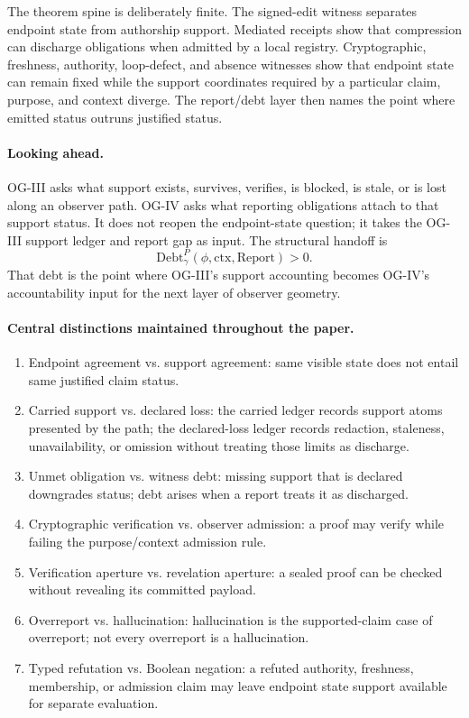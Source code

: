 \documentclass[11pt,twoside]{article}
\theoremstyle{definition}
\newcommand{\Debt}{\mathrm{Debt}}
\newcommand{\Report}{\mathrm{Report}}
\newcommand{\ctx}{\mathrm{ctx}}
\begin{document}
The theorem spine is deliberately finite. The signed-edit witness separates
endpoint state from authorship support. Mediated receipts show that compression
can discharge obligations when admitted by a local registry. Cryptographic,
freshness, authority, loop-defect, and absence witnesses show that endpoint
state can remain fixed while the support coordinates required by a particular
claim, purpose, and context diverge. The report/debt layer then names the point
where emitted status outruns justified status.

\paragraph{Looking ahead.}
OG-III asks what support exists, survives, verifies, is blocked, is stale, or
is lost along an observer path. OG-IV asks what reporting obligations attach to
that support status. It does not reopen the endpoint-state question; it takes
the OG-III support ledger and report gap as input. The structural handoff is
\[
  \Debt_\gamma^P(\phi,\ctx,\Report)>0.
\]
That debt is the point where OG-III's support accounting becomes OG-IV's
accountability input for the next layer of observer geometry.

\paragraph{Central distinctions maintained throughout the paper.}
\begin{enumerate}[leftmargin=*,label=\arabic*.]
  \item Endpoint agreement vs. support agreement: same visible state does not
        entail same justified claim status.
  \item Carried support vs. declared loss: the carried ledger records support
        atoms presented by the path; the declared-loss ledger records redaction,
        staleness, unavailability, or omission without treating those limits as
        discharge.
  \item Unmet obligation vs. witness debt: missing support that is declared
        downgrades status; debt arises when a report treats it as discharged.
  \item Cryptographic verification vs. observer admission: a proof may verify
        while failing the purpose/context admission rule.
  \item Verification aperture vs. revelation aperture: a sealed proof can be
        checked without revealing its committed payload.
  \item Overreport vs. hallucination: hallucination is the supported-claim case
        of overreport; not every overreport is a hallucination.
  \item Typed refutation vs. Boolean negation: a refuted authority, freshness,
        membership, or admission claim may leave endpoint state support
        available for separate evaluation.
\end{enumerate}
\end{document}
